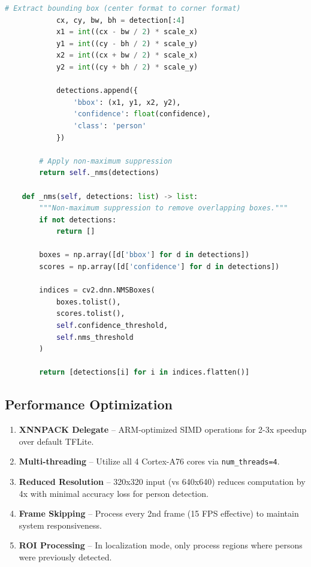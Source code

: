 \begin{lstlisting}[language=Python, caption=person\_detector.py]
            # Extract bounding box (center format to corner format)
            cx, cy, bw, bh = detection[:4]
            x1 = int((cx - bw / 2) * scale_x)
            y1 = int((cy - bh / 2) * scale_y)
            x2 = int((cx + bw / 2) * scale_x)
            y2 = int((cy + bh / 2) * scale_y)

            detections.append({
                'bbox': (x1, y1, x2, y2),
                'confidence': float(confidence),
                'class': 'person'
            })

        # Apply non-maximum suppression
        return self._nms(detections)

    def _nms(self, detections: list) -> list:
        """Non-maximum suppression to remove overlapping boxes."""
        if not detections:
            return []

        boxes = np.array([d['bbox'] for d in detections])
        scores = np.array([d['confidence'] for d in detections])

        indices = cv2.dnn.NMSBoxes(
            boxes.tolist(),
            scores.tolist(),
            self.confidence_threshold,
            self.nms_threshold
        )

        return [detections[i] for i in indices.flatten()]
\end{lstlisting}

\subsection{Performance Optimization}

\begin{enumerate}
    \item \textbf{XNNPACK Delegate} -- ARM-optimized SIMD operations for 2-3x speedup over default TFLite.

    \item \textbf{Multi-threading} -- Utilize all 4 Cortex-A76 cores via \texttt{num\_threads=4}.

    \item \textbf{Reduced Resolution} -- 320x320 input (vs 640x640) reduces computation by 4x with minimal accuracy loss for person detection.

    \item \textbf{Frame Skipping} -- Process every 2nd frame (15 FPS effective) to maintain system responsiveness.

    \item \textbf{ROI Processing} -- In localization mode, only process regions where persons were previously detected.
\end{enumerate}

